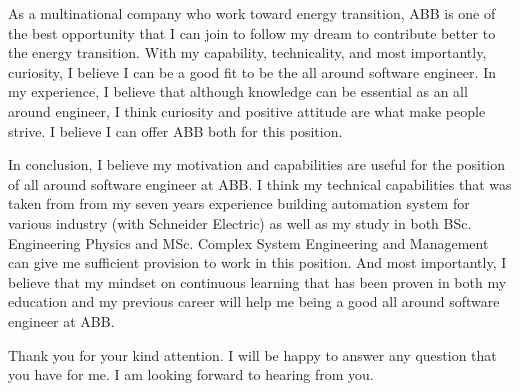 \documentclass[11pt, a4paper]{awesome-cv}
\begin{document}
\begin{cvletter}
As a multinational company who work toward energy transition, ABB is one of the best opportunity that I can join to follow my dream to contribute better to the energy transition. With my capability, technicality, and most importantly, curiosity, I believe I can be a good fit to be the all around software engineer. In my experience, I believe that although knowledge can be essential as an all around engineer, I think curiosity and positive attitude are what make people strive. I believe I can offer ABB both for this position.    

In conclusion, I believe my motivation and capabilities are useful for the position of all around software engineer at ABB. I think my technical capabilities that was taken from from my seven years experience building automation system for various industry (with Schneider Electric)  as well as my study in both BSc. Engineering Physics and MSc. Complex System Engineering and Management can give me sufficient provision to work in this position. And most importantly, I believe that my mindset on continuous learning that has been proven in both my education and my previous career will help me being a good all around software engineer at ABB.

Thank you for your kind attention. I will be happy to answer any question that you have for me. I am looking forward to hearing from you.

\end{cvletter}


\makeletterclosing
\end{document}
